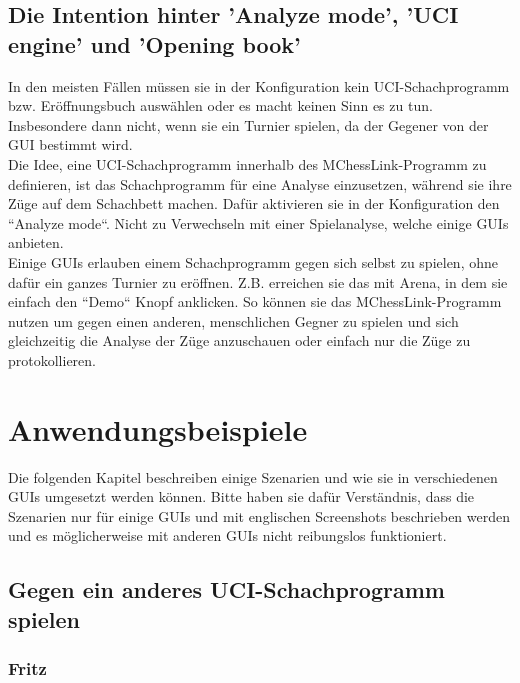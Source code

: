 \documentclass[11pt,a4paper]{article}
\begin{document}
\begin{itemize}
\end{itemize}

\subsection{Die Intention hinter 'Analyze mode', 'UCI engine' und 'Opening book'}
In den meisten Fällen müssen sie in der Konfiguration kein UCI-Schachprogramm bzw. Eröffnungsbuch auswählen oder es macht keinen Sinn es zu tun. Insbesondere dann nicht, wenn sie ein Turnier spielen, da der Gegener von der GUI bestimmt wird.
\\Die Idee, eine UCI-Schachprogramm innerhalb des MChessLink-Programm zu definieren, ist das Schachprogramm für eine Analyse einzusetzen, während sie ihre Züge auf dem Schachbett machen. Dafür aktivieren sie in der Konfiguration den ``Analyze mode``. Nicht zu Verwechseln mit einer Spielanalyse, welche einige GUIs anbieten.\\
Einige GUIs erlauben einem Schachprogramm gegen sich selbst zu spielen, ohne dafür ein ganzes Turnier zu eröffnen. Z.B. erreichen sie das mit Arena, in dem sie einfach den ``Demo`` Knopf anklicken. So können sie das MChessLink-Programm nutzen um gegen einen anderen, menschlichen Gegner zu spielen und sich gleichzeitig die Analyse der Züge anzuschauen oder einfach nur die Züge zu protokollieren.

\newpage
\section{Anwendungsbeispiele}
Die folgenden Kapitel beschreiben einige Szenarien und wie sie in verschiedenen GUIs umgesetzt werden können. Bitte haben sie dafür Verständnis, dass die Szenarien nur für einige GUIs und mit englischen Screenshots beschrieben werden und es möglicherweise mit anderen GUIs nicht reibungslos funktioniert.
\subsection{Gegen ein anderes UCI-Schachprogramm spielen}
\subsubsection{Fritz}
\end{document}
